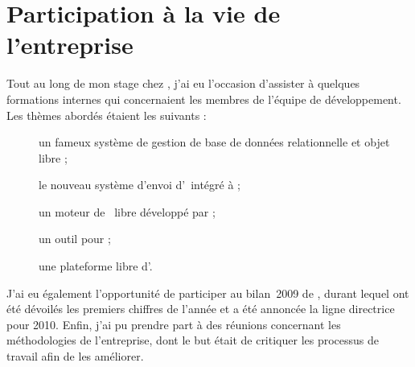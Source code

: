 \section{Participation à la vie de l'entreprise}

Tout au long de mon stage chez \asl, j'ai eu l'occasion d'assister à quelques formations internes qui concernaient les membres de l'équipe de développement. Les thèmes abordés étaient les suivants :

\begin{description}
	\item[\apsql] un fameux système de gestion de base de données relationnelle et objet libre ;
	\item[\aswift] le nouveau système d'envoi d'\aemails\ intégré à \asf ;
	\item[\atwig] un moteur de \atemplate\ libre développé par \apotencier ;
	\item[\asvnmerge] un outil pour \asvn ;
	\item[\amagento] une plateforme libre d'\aecommerce.
\end{description}

J'ai eu également l'opportunité de participer au bilan~2009 de \asensio, durant lequel ont été dévoilés les premiers chiffres de l'année et a été annoncée la ligne directrice pour 2010. Enfin, j'ai pu prendre part à des réunions concernant les méthodologies de l'entreprise, dont le but était de critiquer les processus de travail afin de les améliorer.
